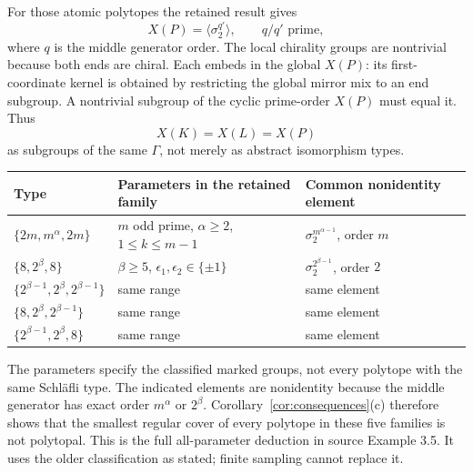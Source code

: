 For those atomic polytopes the retained result gives
\[
              X(P)=\langle\sigma_2^{q'}\rangle,
                     \qquad q/q'\text{ prime},
\]
where $q$ is the middle generator order. The local chirality groups are nontrivial because both ends are chiral. Each embeds in the global $X(P)$: its first-coordinate kernel is obtained by restricting the global mirror mix to an end subgroup. A nontrivial subgroup of the cyclic prime-order $X(P)$ must equal it. Thus
\[
                         X(K)=X(L)=X(P)
\]
as subgroups of the same $\Gamma$, not merely as abstract isomorphism types.

\begin{center}\small
\begin{tabular}{@{}p{}p{}p{}@{}}\toprule
Type & Parameters in the retained family & Common nonidentity element\\\midrule
$\{2m,m^\alpha,2m\}$ & $m$ odd prime, $\alpha\geq2$, $1\leq k\leq m-1$ & $\sigma_2^{m^{\alpha-1}}$, order $m$\\[3pt]
$\{8,2^\beta,8\}$ & $\beta\geq5$, $\epsilon_1,\epsilon_2\in\{\pm1\}$ & $\sigma_2^{2^{\beta-1}}$, order $2$\\[3pt]
$\{2^{\beta-1},2^\beta,2^{\beta-1}\}$ & same range & same element\\[3pt]
$\{8,2^\beta,2^{\beta-1}\}$ & same range & same element\\[3pt]
$\{2^{\beta-1},2^\beta,8\}$ & same range & same element\\\bottomrule
\end{tabular}
\end{center}
The parameters specify the classified marked groups, not every polytope with the same Schläfli type. The indicated elements are nonidentity because the middle generator has exact order $m^\alpha$ or $2^\beta$. Corollary~\ref{cor:consequences}(c) therefore shows that the smallest regular cover of every polytope in these five families is not polytopal. This is the full all-parameter deduction in source Example 3.5. It uses the older classification as stated; finite sampling cannot replace it.
